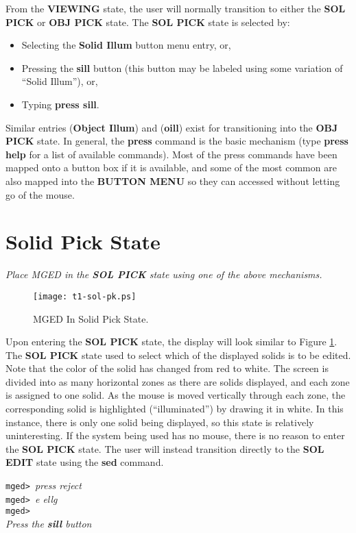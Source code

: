 From the {\bf VIEWING} state, the user will normally transition to either the
{\bf SOL PICK} or {\bf OBJ PICK} state.
The {\bf SOL PICK} state is selected by:
\begin{itemize}
\item Selecting the {\bf Solid Illum} button menu entry, or,
\item Pressing the {\bf sill} button (this button may be labeled
using some variation of ``Solid Illum''), or,
\item Typing {\bf press sill}.
\end{itemize}
Similar entries ({\bf Object Illum}) and ({\bf oill}) exist for transitioning
into the {\bf OBJ PICK} state.
In general, the {\bf press} command is the basic mechanism (type
{\bf press help} for a list of available commands).  Most of the press
commands have been mapped onto a button box if it is available,
 and some of the
most common are also mapped into the {\bf BUTTON MENU} so they can
accessed without letting go of the mouse.

\section{Solid Pick State}

\noindent
{\em Place MGED in the {\bf SOL PICK} state using one of the
above mechanisms.}\\

\begin{figure}
\centering \texttt{[image: t1-sol-pk.ps]}
\caption{MGED In Solid Pick State.}
\label{t1-sol-pk}
\end{figure}

Upon entering the {\bf SOL PICK} state, the display will look similar to
Figure \ref{t1-sol-pk}.  The {\bf SOL PICK} state used to select which
of the displayed solids is to be edited.  Note that the color of the
solid has changed from red to white.  The screen is divided into as many
horizontal zones as there are solids displayed, and each zone is
assigned to one solid.  As the mouse is moved vertically through each
zone, the corresponding solid is highlighted (``illuminated'') by
drawing it in white.   In this instance, there is only one solid being
displayed, so this state is relatively uninteresting.
If the system being used has no mouse, there is no reason to enter the
{\bf SOL PICK} state.  The user will instead transition directly to
the {\bf SOL EDIT} state using the {\bf sed} command.

\noindent
{\tt mged> }{\em press reject}\\
{\tt mged> }{\em e ellg}\\
{\tt mged> }\\
{\em Press the {\bf sill} button}\\

